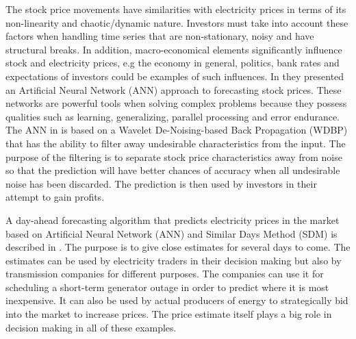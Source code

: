 The stock price movements have similarities with electricity prices in terms of its non-linearity and chaotic/dynamic nature. Investors must take into account these factors when handling time series that are non-stationary, noisy and have structural breaks\cite{stockForecasting}. In addition, macro-economical elements significantly influence stock and electricity prices, e.g the economy in general, politics, bank rates and expectations of investors could be examples of such influences. In \cite{stockForecasting} they presented an Artificial Neural Network (ANN) approach to forecasting stock prices. These networks are powerful tools when solving complex problems because they possess qualities such as learning, generalizing, parallel processing and error endurance. The ANN in \cite{stockForecasting} is based on a Wavelet De-Noising-based Back Propagation (WDBP) that has the ability to filter away undesirable characteristics from the input. The purpose of the filtering is to separate stock price characteristics away from noise so that the prediction will have better chances of accuracy when all undesirable noise has been discarded. The prediction is then used by investors in their attempt to gain profits. 

A day-ahead forecasting algorithm that predicts electricity prices in the market based on Artificial Neural Network (ANN) and Similar Days Method (SDM) is described in \cite{pjmForecast}. The purpose is to give close estimates for several days to come. The estimates can be used by electricity traders in their decision making but also by transmission companies for different purposes. The companies can use it for scheduling a short-term generator outage in order to predict where it is most inexpensive. It can also be used by actual producers of energy to strategically bid into the market to increase prices. The price estimate itself plays a big role in decision making in all of these examples.

